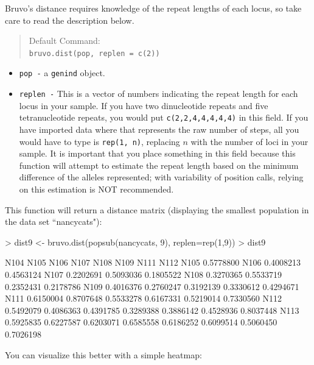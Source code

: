 \documentclass[letterpaper]{article}
\newcommand{\tab}{\hspace*{1em}}
\begin{document}
\tab\tab Bruvo's distance requires knowledge of the repeat lengths of each locus, so take care to read the description below.
\begin{quote}
Default Command:\\
\texttt{bruvo.dist(pop, replen = c(2))}
\end{quote}
\begin{itemize}
  \item \texttt{pop -} a \texttt{genind} object.
  \item \texttt{replen -} This is a vector of numbers indicating the repeat length for each locus in your sample. If you have two dinucleotide repeats and five tetranucleotide repeats, you would put \texttt{c(2,2,4,4,4,4,4)} in this field. If you have imported data where that represents the raw number of steps, all you would have to type is \texttt{rep(1, n)}, replacing $n$ with the number of loci in your sample. It is important that you place something in this field because this function will attempt to estimate the repeat length based on the minimum difference of the alleles represented; with variability of position calls, relying on this estimation is NOT recommended. 
\end{itemize}
This function will return a distance matrix (displaying the smallest population in the data set ``nancycats"):
\begin{Schunk}
\begin{Sinput}
> dist9 <- bruvo.dist(popsub(nancycats, 9), replen=rep(1,9))
> dist9
\end{Sinput}
\begin{Soutput}
          N104      N105      N106      N107      N108      N109      N111      N112
N105 0.5778800                                                                      
N106 0.4008213 0.4563124                                                            
N107 0.2202691 0.5093036 0.1805522                                                  
N108 0.3270365 0.5533719 0.2352431 0.2178786                                        
N109 0.4016376 0.2760247 0.3192139 0.3330612 0.4294671                              
N111 0.6150004 0.8707648 0.5533278 0.6167331 0.5219014 0.7330560                    
N112 0.5492079 0.4086363 0.4391785 0.3289388 0.3886142 0.4528936 0.8037448          
N113 0.5925835 0.6227587 0.6203071 0.6585558 0.6186252 0.6099514 0.5060450 0.7026198
\end{Soutput}
\end{Schunk}
You can visualize this better with a simple heatmap:\\
\end{document}
